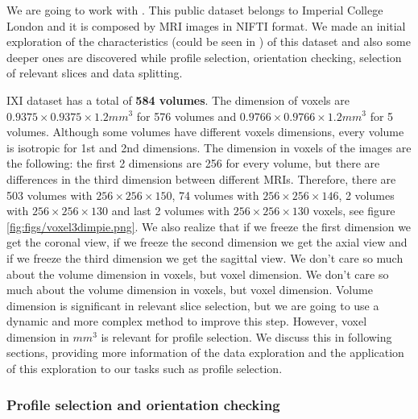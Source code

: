 We are going to work with . This public dataset belongs to Imperial College London and it is composed by MRI images in NIFTI format. We made an initial exploration of the characteristics (could be seen in ) of this dataset and also some deeper ones are discovered while profile selection, orientation checking, selection of relevant slices and data splitting. 

IXI dataset has a total of \textbf{584 volumes}. The dimension of voxels are $0.9375\times0.9375\times1.2 mm^3$ for 576 volumes and $0.9766\times0.9766\times1.2 mm^3$ for 5 volumes. Although some volumes have different voxels dimensions, every volume is isotropic for 1st and 2nd dimensions. The dimension in voxels of the images are the following: the first 2 dimensions are 256 for every volume, but there are differences in the third dimension between different MRIs. Therefore, there are 503 volumes with $256\times256\times150$, 74 volumes with $256\times256\times146$, 2 volumes with $256\times256\times130$ and last 2 volumes with $256\times256\times130$ voxels, see figure \ref{fig:figs/voxel3dimpie.png}. We also realize that if we freeze the first dimension we get the coronal view, if we freeze the second dimension we get the axial view and if we freeze the third dimension we get the sagittal view. We don't care so much about the volume dimension in voxels, but voxel dimension. We don't care so much about the volume dimension in voxels, but voxel dimension. Volume dimension is significant in relevant slice selection, but we are going to use a dynamic and more complex method to improve this step. However, voxel dimension in $mm^3$ is relevant for profile selection. We discuss this in following sections, providing more information of the data exploration and the application of this exploration to our tasks such as profile selection. 


\subsubsection{Profile selection and orientation checking}

